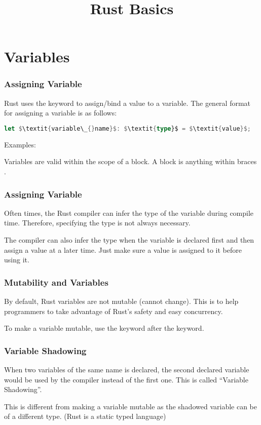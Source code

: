 \documentclass{beamer}
\title{Rust Basics}
\begin{document}
\begin{frame}
  \titlepage{}
\end{frame}

\section{Variables}
\begin{frame}[fragile]
  \frametitle{Assigning Variable}
  Rust uses the  keyword to assign/bind a value to a variable. The general format for assigning a variable is as follows:

\begin{lstlisting}[mathescape=true, language=Rust]
let $\textit{variable\_{}name}$: $\textit{type}$ = $\textit{value}$;
\end{lstlisting}

  Examples:
  

  Variables are valid within the scope of a block. A block is anything within braces \inlinecode{\{\}}.
\end{frame}

\begin{frame}[fragile]
  \frametitle{Assigning Variable}
  Often times, the Rust compiler can infer the type of the variable during compile time. Therefore, specifying the type is not always necessary.
  

  The compiler can also infer the type when the variable is declared first and then assign a value at a later time. Just make sure a value is assigned to it before using it.
  
\end{frame}

\begin{frame}
  \frametitle{Mutability and Variables}
  By default, Rust variables are not mutable (cannot change). This is to help programmers to take advantage of Rust's safety and easy concurrency.
  

  To make a variable mutable, use the  keyword after the  keyword.
  
\end{frame}

\begin{frame}
  \frametitle{Variable Shadowing}
  When two variables of the same name is declared, the second declared variable would be used by the compiler instead of the first one. This is called ``Variable Shadowing''.
  

  This is different from making a variable mutable as the shadowed variable can be of a different type. (Rust is a static typed language)
\end{frame}
\end{document}
